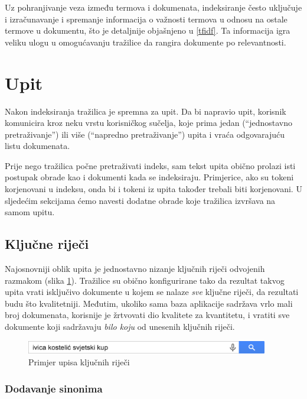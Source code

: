 \documentclass[a4paper,twoside,12pt]{scrreprt}
\begin{document}
Uz pohranjivanje veza između termova i dokumenata, indeksiranje često uključuje i izračunavanje i spremanje informacija o važnosti termova u odnosu na ostale termove u dokumentu, što je detaljnije objašnjeno u \ref{tfidf}. Ta informacija igra veliku ulogu u omogućavanju tražilice da rangira dokumente po relevantnosti.

\section{Upit}

Nakon indeksiranja tražilica je spremna za upit. Da bi napravio upit, korisnik komunicira kroz neku vrstu korisničkog sučelja, koje prima jedan (``jednostavno pretraživanje'') ili više (``napredno pretraživanje'') upita i vraća odgovarajuću listu dokumenata.

Prije nego tražilica počne pretraživati indeks, sam tekst upita obično prolazi isti postupak obrade kao i dokumenti kada se indeksiraju. Primjerice, ako su tokeni korjenovani u indeksu, onda bi i tokeni iz upita također trebali biti korjenovani. U sljedećim sekcijama ćemo navesti dodatne obrade koje tražilica izvršava na samom upitu.

\subsection{Ključne riječi}

Najosnovniji oblik upita je jednostavno nizanje ključnih riječi odvojenih razmakom (slika \ref{keywords}). Tražilice su obično konfigurirane tako da rezultat takvog upita vrati isključivo dokumente u kojem se nalaze \textit{sve} ključne riječi, da rezultati budu što kvalitetniji. Međutim, ukoliko sama baza aplikacije sadržava vrlo mali broj dokumenata, korisnije je žrtvovati dio kvalitete za kvantitetu, i vratiti sve dokumente koji sadržavaju \textit{bilo koju} od unesenih ključnih riječi.

\begin{figure}[H]
  \centering
  \includegraphics[width=300pt]{keywords}
  \caption{Primjer upisa ključnih riječi}
  \label{keywords}
\end{figure}

\subsubsection{Dodavanje sinonima}
\end{document}
